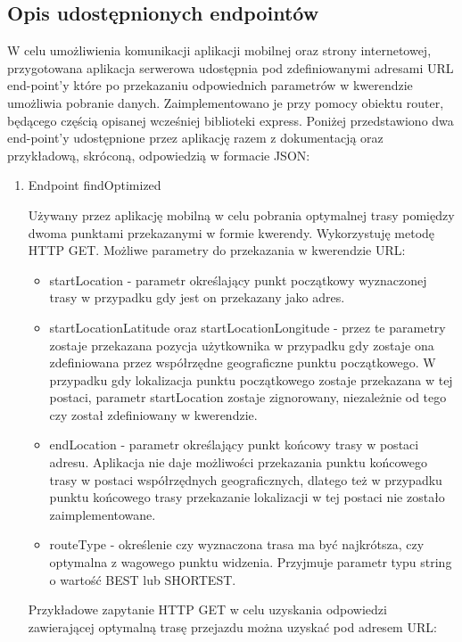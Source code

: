 \subsection{Opis udostępnionych endpointów}

W celu umożliwienia komunikacji aplikacji mobilnej oraz strony internetowej, przygotowana aplikacja serwerowa udostępnia pod zdefiniowanymi adresami URL end-point’y które po przekazaniu odpowiednich parametrów w kwerendzie umożliwia pobranie danych. Zaimplementowano je przy pomocy obiektu router, będącego częścią opisanej wcześniej biblioteki express.
Poniżej przedstawiono dwa end-point’y udostępnione przez aplikację razem z dokumentacją oraz przykładową, skróconą, odpowiedzią w formacie JSON:
\begin{enumerate}
\item Endpoint findOptimized

Używany przez aplikację mobilną w celu pobrania optymalnej trasy pomiędzy dwoma punktami przekazanymi w formie kwerendy. Wykorzystuję metodę HTTP GET. Możliwe parametry do przekazania w kwerendzie URL:

\begin{itemize}
\item startLocation - parametr określający punkt początkowy wyznaczonej trasy w przypadku gdy jest on przekazany jako adres.
\item startLocationLatitude oraz startLocationLongitude - przez te parametry zostaje przekazana pozycja użytkownika w przypadku gdy zostaje ona zdefiniowana przez współrzędne geograficzne punktu początkowego. W przypadku gdy lokalizacja punktu początkowego zostaje przekazana w tej postaci, parametr startLocation zostaje zignorowany, niezależnie od tego czy został zdefiniowany w kwerendzie.
\item endLocation - parametr określający punkt końcowy trasy w postaci adresu. Aplikacja nie daje możliwości przekazania punktu końcowego trasy w postaci współrzędnych geograficznych, dlatego też w przypadku punktu końcowego trasy przekazanie lokalizacji w tej postaci nie zostało zaimplementowane.
\item routeType - określenie czy wyznaczona trasa ma być najkrótsza, czy optymalna z wagowego punktu widzenia. Przyjmuje parametr typu string o wartość BEST lub SHORTEST.
\end{itemize}

Przykładowe zapytanie HTTP GET w celu uzyskania odpowiedzi zawierającej optymalną trasę przejazdu można uzyskać pod adresem URL:


\end{enumerate}
